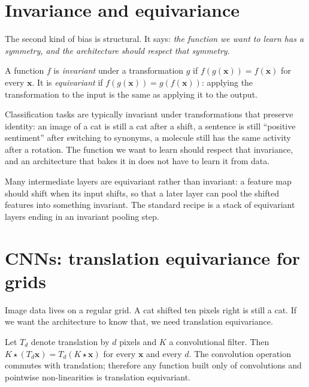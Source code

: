 \section{Invariance and equivariance}

The second kind of bias is structural. It says: \emph{the function we want to learn has a symmetry, and the architecture should respect that symmetry}.

\begin{definition}
A function $f$ is \emph{invariant} under a transformation $g$ if $f(g(\bm{x})) = f(\bm{x})$ for every $\bm{x}$. It is \emph{equivariant} if $f(g(\bm{x})) = g(f(\bm{x}))$: applying the transformation to the input is the same as applying it to the output.
\end{definition}

Classification tasks are typically invariant under transformations that preserve identity: an image of a cat is still a cat after a shift, a sentence is still ``positive sentiment'' after switching to synonyms, a molecule still has the same activity after a rotation. The function we want to learn should respect that invariance, and an architecture that bakes it in does not have to learn it from data.

Many intermediate layers are equivariant rather than invariant: a feature map should shift when its input shifts, so that a later layer can pool the shifted features into something invariant. The standard recipe is a stack of equivariant layers ending in an invariant pooling step.

\section{CNNs: translation equivariance for grids}

Image data lives on a regular grid. A cat shifted ten pixels right is still a cat. If we want the architecture to know that, we need translation equivariance.

\begin{proposition}
Let $T_d$ denote translation by $d$ pixels and $K$ a convolutional filter. Then $K \star (T_d \bm{x}) = T_d (K \star \bm{x})$ for every $\bm{x}$ and every $d$. The convolution operation commutes with translation; therefore any function built only of convolutions and pointwise non-linearities is translation equivariant.
\end{proposition}

